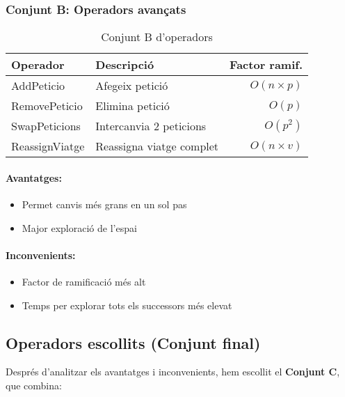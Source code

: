 \subsubsection{Conjunt B: Operadors avançats}

\begin{table}[H]
\centering
\begin{tabular}{@{}llr@{}}
\toprule
\textbf{Operador} & \textbf{Descripció} & \textbf{Factor ramif.} \\
\midrule
AddPeticio & Afegeix petició & $O(n \times p)$ \\
RemovePeticio & Elimina petició & $O(p)$ \\
SwapPeticions & Intercanvia 2 peticions & $O(p^2)$ \\
ReassignViatge & Reassigna viatge complet & $O(n \times v)$ \\
\bottomrule
\end{tabular}
\caption{Conjunt B d'operadors}
\label{tab:operators-b}
\end{table}

\paragraph{Avantatges:}
\begin{itemize}
    \item Permet canvis més grans en un sol pas
    \item Major exploració de l'espai
\end{itemize}

\paragraph{Inconvenients:}
\begin{itemize}
    \item Factor de ramificació més alt
    \item Temps per explorar tots els successors més elevat
\end{itemize}

\subsection{Operadors escollits (Conjunt final)}

Després d'analitzar els avantatges i inconvenients, hem escollit el \textbf{Conjunt C}, que combina:


